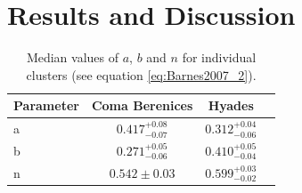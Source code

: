 \section{Results and Discussion}
\label{sec:results}

\begin{table}
	\caption[Individual cluster results.]
{Median values of $a$, $b$ and $n$ for individual clusters
		(see equation \ref{eq:Barnes2007_2}).  %
\label{tab:cluster_results}}

\begin{center}
\begin{tabular}{lccc}
\hline\hline
{Parameter} & {Coma Berenices} & {Hyades} \\
\hline
a & $0.417^{+0.08}_{-0.07}$ & $0.312^{+0.04}_{-0.06}$ \\
b & $0.271^{+0.05}_{-0.06}$ & $0.410^{+0.05}_{-0.04}$ \\
n & $0.542 \pm 0.03$ & $0.599^{+0.03}_{-0.02}$ \\
\hline
\end{tabular}
\end{center}
\end{table}

